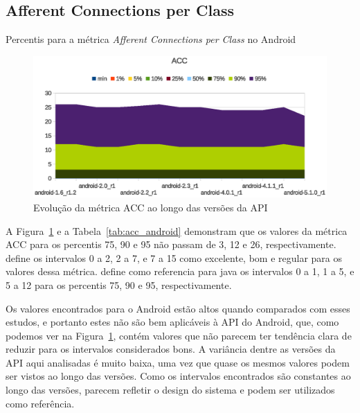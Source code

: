 \subsection{Afferent Connections per Class}

\begin{table}[!htb]

\caption{Percentis para a métrica \textit{Afferent Connections per Class} no Android}
\label{tab:acc_android}
\end{table}

\begin{figure}[!htb]
\centering
\includegraphics [keepaspectratio=true,scale=0.85]{figuras/graphs/acc_android.eps}
\caption{Evolução da métrica ACC ao longo das versões da API}
\label{fig:acc_android}
\end{figure}

A Figura~\ref{fig:acc_android} e a Tabela~\ref{tab:acc_android} demonstram que os valores da métrica ACC para os percentis 75, 90 e 95 não passam de 3, 12 e 26, respectivamente.  define os intervalos 0 a 2, 2 a 7, e 7 a 15 como excelente, bom e regular para os valores dessa métrica.  define como referencia para java os intervalos 0 a 1, 1 a 5, e 5 a 12 para os percentis 75, 90 e 95, respectivamente.

Os valores encontrados para o Android estão altos quando comparados com esses estudos, e portanto estes não são bem aplicáveis à API do Android, que, como podemos ver na Figura~\ref{fig:acc_android}, contém valores que não parecem ter tendência clara de reduzir para os intervalos considerados bons. A variância dentre as versões da API aqui analisadas é muito baixa, uma vez que quase os mesmos valores podem ser vistos ao longo das versões. Como os intervalos encontrados são constantes ao longo das versões, parecem refletir o design do sistema e podem ser utilizados como referência.

